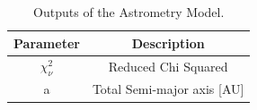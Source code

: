 \documentclass[12pt,preprint]{aastex}
\begin{document}

\begin{table}[h]
\centering
\caption{ Outputs of the Astrometry Model.}
\begin{tabular}{c c}
\hline\hline
Parameter & Description \\
\hline
$\chi^{2}_{\nu}$ & Reduced Chi Squared \\
a & Total Semi-major axis [AU]  \\

\hline
\end{tabular}
\end{table}



\pagebreak
\end{document}
